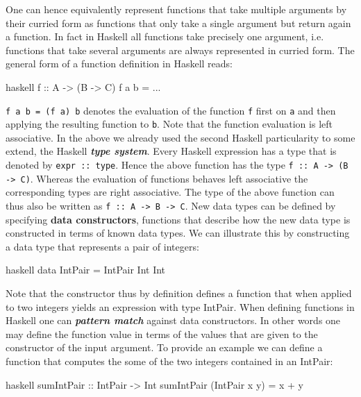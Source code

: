 \documentclass[a4paper,12pt, DIV=14, BCOR=5mm, twoside, headsepline]{scrbook}
\begin{document}
One can hence equivalently represent functions that take multiple arguments by their curried form as functions that only take a single argument but return again a function. In fact in Haskell all functions take precisely one argument, i.e. functions that take several arguments are always represented in curried form. The general form of a function definition in Haskell reads:
\begin{center}
\begin{cminted}{haskell}
f :: A -> (B -> C)
f a b = ...  
\end{cminted}
\end{center}
\texttt{f a b = (f a) b} denotes the evaluation of the function \texttt{f} first on \texttt{a} and then applying the resulting function to \texttt{b}. Note that the function evaluation is left associative.
In the above we already used the second Haskell particularity to some extend, the Haskell \textbf{\textit{type system}}. Every Haskell expression has a type that is denoted by \texttt{expr :: type}. Hence the above function  has the type \texttt{f :: A -> (B -> C)}. Whereas the evaluation of functions behaves left associative the corresponding types are right associative. The type of the above function can thus also be written as \texttt{f :: A -> B -> C}.
New data types can be defined by specifying \textbf{\textbf{data constructors}}, functions that describe how the new data type is constructed in terms of known data types. We can illustrate this by constructing a data type that represents a pair of integers:
\begin{center}
\begin{cminted}{haskell}
data IntPair = IntPair Int Int 
\end{cminted}
\end{center}
Note that the constructor thus by definition defines a function that when applied to two integers yields an expression with type IntPair. When defining functions in Haskell one can \textbf{\textit{pattern match}} against data constructors. In other words one may define the function value in terms of the values that are given to the constructor of the input argument. To provide an example we can define a function that computes the some of the two integers contained in an IntPair:
\begin{center}
\begin{cminted}{haskell}
sumIntPair :: IntPair -> Int 
sumIntPair (IntPair x y) = x + y
\end{cminted}
\end{center}
\end{document}
